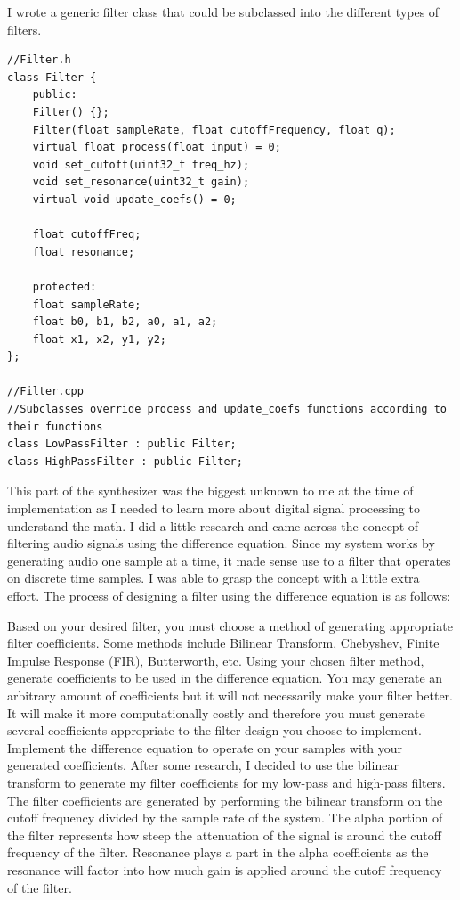 \documentclass[acmlarge,screen]{acmart}
\begin{document}
I wrote a generic filter class that could be subclassed into the different types of filters.
\begin{lstlisting}
//Filter.h
class Filter {
	public:
	Filter() {};
	Filter(float sampleRate, float cutoffFrequency, float q);
	virtual float process(float input) = 0;
	void set_cutoff(uint32_t freq_hz);
	void set_resonance(uint32_t gain);
	virtual void update_coefs() = 0;
	
	float cutoffFreq;
	float resonance;
	
	protected:
	float sampleRate;
	float b0, b1, b2, a0, a1, a2;
	float x1, x2, y1, y2;
};

//Filter.cpp
//Subclasses override process and update_coefs functions according to their functions
class LowPassFilter : public Filter;
class HighPassFilter : public Filter;
\end{lstlisting}

This part of the synthesizer was the biggest unknown to me at the time of implementation as I needed to learn more about digital signal processing to understand the math. I did a little research and came across the concept of filtering audio signals using the difference equation. Since my system works by generating audio one sample at a time, it made sense use to a filter that operates on discrete time samples. I was able to grasp the concept with a little extra effort. The process of designing a filter using the difference equation is as follows:

Based on your desired filter, you must choose a method of generating appropriate filter coefficients. Some methods include Bilinear Transform, Chebyshev, Finite Impulse Response (FIR), Butterworth, etc.
Using your chosen filter method, generate coefficients to be used in the difference equation. You may generate an arbitrary amount of coefficients but it will not necessarily make your filter better. It will make it more computationally costly and therefore you must generate several coefficients appropriate to the filter design you choose to implement.
Implement the difference equation to operate on your samples with your generated coefficients.
After some research, I decided to use the bilinear transform to generate my filter coefficients for my low-pass and high-pass filters. The filter coefficients are generated by performing the bilinear transform on the cutoff frequency divided by the sample rate of the system. The alpha portion of the filter represents how steep the attenuation of the signal is around the cutoff frequency of the filter. Resonance plays a part in the alpha coefficients as the resonance will factor into how much gain is applied around the cutoff frequency of the filter.
\end{document}

